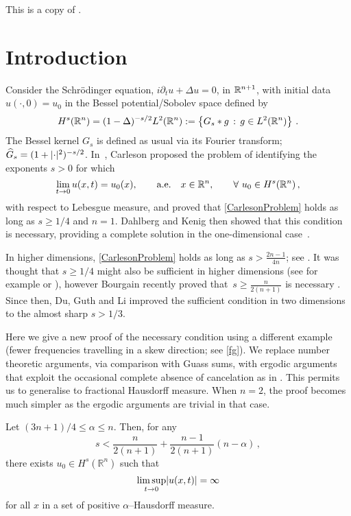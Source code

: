 \documentclass[biblatex]{pzorin-note}
\begin{document}
This is a copy of \cite{arxiv:1703.01360}.

\section{Introduction}
Consider the Schr\"odinger equation, $i \partial_{t} u +\Delta u=0$, in $\mathbb{R}^{n+1}$, with
initial data $u(\cdot, 0) = u_0$ in the Bessel potential/Sobolev space defined by
\[
H^{s}(\mathbb{R}^{n}) = (1-\Delta)^{-s/2}L^2(\mathbb{R}^{n}):=\left\{
G_{s} * g \, : \, g \in L^{2}(\mathbb{R}^n)
\right\} \, .
\]
The Bessel kernel $G_{s}$ is defined as usual via its Fourier transform; $\widehat{G}_{s} = (1 + \lvert\cdot\rvert^{2})^{- s/2}$.
In~\cite{Carl}, Carleson proposed the problem of identifying
the exponents $s > 0$ for which
\begin{equation}\label{CarlesonProblem}
\lim_{t\to 0} u(x , t) = u_0(x), \qquad \text{a.e.} \quad x \in \mathbb{R}^n, \qquad \forall \ u_0\in H^s(\mathbb{R}^{n}) \, ,
\end{equation}
with respect to Lebesgue measure, and proved that \eqref{CarlesonProblem} holds as long as
$s \geq 1/4$ and $n=1$. Dahlberg and Kenig then showed that this condition is necessary, providing a complete solution in the one-dimensional case~\cite{DahlKenig}.



In higher dimensions, \eqref{CarlesonProblem} holds as long as
$s > \frac{2n-1}{4n}$; see \cite{L, B}.
It was thought that $s\ge 1/4$ might also be sufficient in higher dimensions (see for example \cite{GS} or \cite{T}), however
Bourgain recently proved that~$s\ge\frac{n}{2(n+1)}$ is necessary \cite{Bnew}. Since then, Du, Guth and Li \cite{DGL} improved the sufficient condition in two dimensions to the almost sharp $s>1/3$.

Here we give a new proof of the necessary condition using a different example (fewer frequencies travelling in a skew direction; see \eqref{fg}).
We replace number theoretic arguments, via comparison with Guass sums, with ergodic arguments that exploit
the occasional complete absence of cancelation as in \cite{LuR2}.
This permits us to generalise to fractional Hausdorff measure.
When $n=2$, the proof becomes much simpler as the ergodic arguments are trivial in that case.

\begin{theorem}\label{Thm:DirectConv}
Let $ (3n+1)/4 \leq \alpha \leq n$.
Then, for any
\begin{equation}\label{INTVAL}
s < \frac{n}{2(n+1)}+\frac{n-1}{2(n+1)}(n-\alpha) \, ,
\end{equation}
there exists $u_0 \in H^{s}(\mathbb{R}^{n})$ such that
\[
\limsup_{t \to 0} \lvert u(x,t) \rvert = \infty
\]
for all $x$ in a set
of positive $\alpha$--Hausdorff measure.
\end{theorem}
\end{document}
